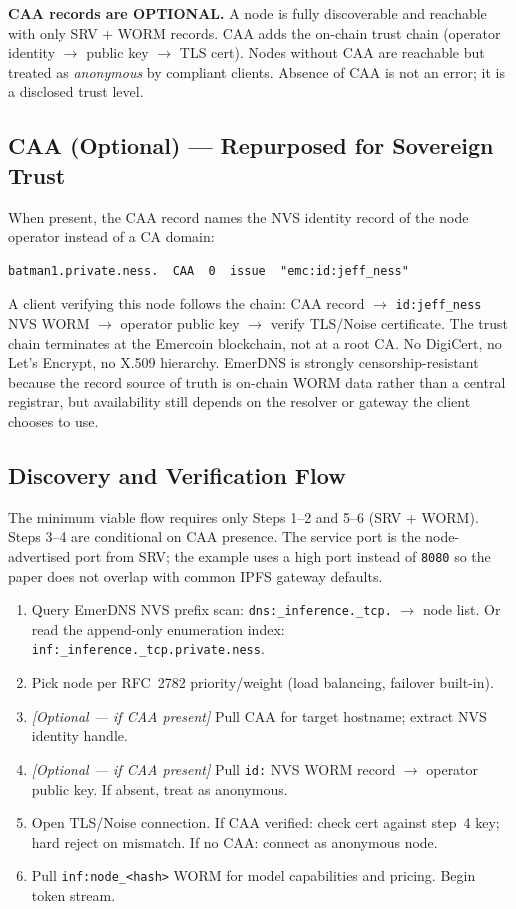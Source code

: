\documentclass[11pt,a4paper]{article}
\begin{document}
\begin{warnbox}
\textbf{CAA records are OPTIONAL.} A node is fully discoverable and reachable with only SRV + WORM records. CAA adds the on-chain trust chain (operator identity $\to$ public key $\to$ TLS cert). Nodes without CAA are reachable but treated as \emph{anonymous} by compliant clients. Absence of CAA is not an error; it is a disclosed trust level.
\end{warnbox}

\subsection{CAA (Optional) — Repurposed for Sovereign Trust}

When present, the CAA record names the NVS identity record of the node operator instead of a CA domain:
\begin{lstlisting}
batman1.private.ness.  CAA  0  issue  "emc:id:jeff_ness"
\end{lstlisting}
A client verifying this node follows the chain: CAA record $\to$ \texttt{id:jeff\_ness} NVS WORM $\to$ operator public key $\to$ verify TLS/Noise certificate. The trust chain terminates at the Emercoin blockchain, not at a root CA. No DigiCert, no Let's Encrypt, no X.509 hierarchy. EmerDNS is strongly censorship-resistant because the record source of truth is on-chain WORM data rather than a central registrar, but availability still depends on the resolver or gateway the client chooses to use.

\subsection{Discovery and Verification Flow}

The minimum viable flow requires only Steps 1--2 and 5--6 (SRV + WORM). Steps 3--4 are conditional on CAA presence. The service port is the node-advertised port from SRV; the example uses a high port instead of \texttt{8080} so the paper does not overlap with common IPFS gateway defaults.

\begin{enumerate}
  \item Query EmerDNS NVS prefix scan: \texttt{dns:\_inference.\_tcp.} $\to$ node list. Or read the append-only enumeration index: \texttt{inf:\_inference.\_tcp.private.ness}.
  \item Pick node per RFC~2782 priority/weight (load balancing, failover built-in).
  \item \textit{[Optional — if CAA present]} Pull CAA for target hostname; extract NVS identity handle.
  \item \textit{[Optional — if CAA present]} Pull \texttt{id:} NVS WORM record $\to$ operator public key. If absent, treat as anonymous.
  \item Open TLS/Noise connection. If CAA verified: check cert against step~4 key; hard reject on mismatch. If no CAA: connect as anonymous node.
  \item Pull \texttt{inf:node\_\textless hash\textgreater} WORM for model capabilities and pricing. Begin token stream.
\end{enumerate}
\end{document}
